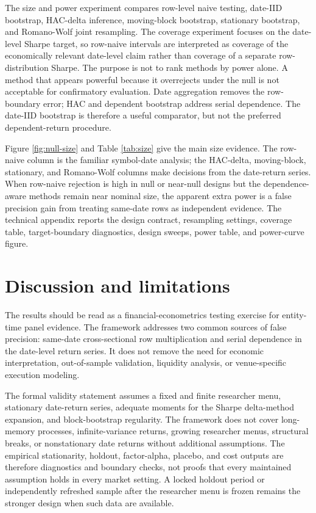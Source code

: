 \documentclass[12pt,a4paper]{article}
\begin{document}
The size and power experiment compares row-level naive testing,
date-IID bootstrap, HAC-delta inference, moving-block bootstrap,
stationary bootstrap, and Romano-Wolf joint resampling.  The coverage
experiment focuses on the date-level Sharpe target, so row-naive
intervals are interpreted as coverage of the economically relevant
date-level claim rather than coverage of a separate row-distribution
Sharpe.  The purpose is not to rank methods by power alone.  A method
that appears powerful because it overrejects under the null is not
acceptable for confirmatory evaluation.
Date aggregation removes the row-boundary error; HAC and dependent
bootstrap address serial dependence.  The date-IID bootstrap is therefore
a useful comparator, but not the preferred dependent-return procedure.

Figure \ref{fig:null-size} and Table \ref{tab:size} give the main size
evidence.  The row-naive column is the familiar symbol-date analysis; the
HAC-delta, moving-block, stationary, and Romano-Wolf columns make
decisions from the date-return series.  When row-naive rejection is high
in null or near-null designs but the dependence-aware methods remain
near nominal size, the apparent extra power is a false precision gain
from treating same-date rows as independent evidence.  The technical
appendix reports the design contract, resampling settings, coverage
table, target-boundary diagnostics, design sweeps, power table, and
power-curve figure.



\section{Discussion and limitations}

The results should be read as a financial-econometrics testing exercise
for entity-time panel evidence.  The framework addresses two common
sources of false precision: same-date cross-sectional row multiplication
and serial dependence in the date-level return series.  It does not
remove the need for economic interpretation, out-of-sample validation,
liquidity analysis, or venue-specific execution modeling.

The formal validity statement assumes a fixed and finite researcher menu,
stationary date-return series, adequate moments for the Sharpe
delta-method expansion, and block-bootstrap regularity.  The framework
does not cover long-memory processes, infinite-variance returns, growing
researcher menus, structural breaks, or nonstationary date returns
without additional assumptions.  The empirical stationarity, holdout,
factor-alpha, placebo, and cost outputs are therefore diagnostics and
boundary checks, not proofs that every maintained assumption holds in
every market setting.  A locked holdout period or independently refreshed
sample after the researcher menu is frozen remains the stronger design
when such data are available.
\end{document}
